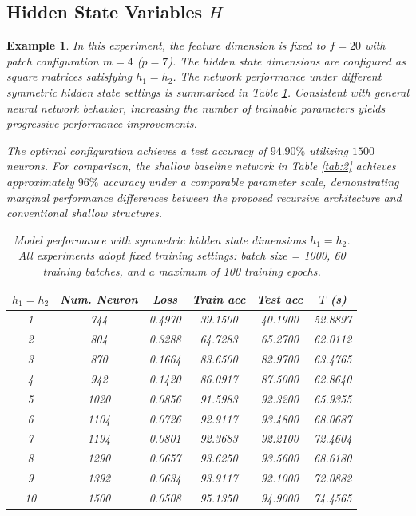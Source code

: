 \documentclass[pdflatex,sn-mathphys-num]{sn-jnl}%
\theoremstyle{thmstyleone}%
\theoremstyle{thmstyletwo}%
\newtheorem{example}{Example}%
\theoremstyle{thmstylethree}%
\begin{document}
\subsection{Hidden State Variables $H$}
\begin{example}
In this experiment, the feature dimension is fixed to $f=20$ with patch configuration $m=4$ ($p=7$). The hidden state dimensions are configured as square matrices satisfying $h_1=h_2$. The network performance under different symmetric hidden state settings is summarized in Table \ref{Tab:6}. Consistent with general neural network behavior, increasing the number of trainable parameters yields progressive performance improvements. 

The optimal configuration achieves a test accuracy of $94.90\%$ utilizing $1500$ neurons. For comparison, the shallow baseline network in Table \ref{tab:2} achieves approximately $96\%$ accuracy under a comparable parameter scale, demonstrating marginal performance differences between the proposed recursive architecture and conventional shallow structures.

\begin{table}[htbp]
\centering
\caption{Model performance with symmetric hidden state dimensions $h_1=h_2$. All experiments adopt fixed training settings: batch size = 1000, 60 training batches, and a maximum of 100 training epochs.}
\label{Tab:6}
\begin{tabular}{cccccc}
\toprule
$h_1=h_2$ &  Num. Neuron & Loss    & Train acc & Test acc & $T$ (s) \\
\midrule
1  & 744  & 0.4970 & 39.1500 & 40.1900 & 52.8897 \\
2  & 804  & 0.3288 & 64.7283 & 65.2700 & 62.0112 \\ 
3  & 870  & 0.1664 & 83.6500 & 82.9700 & 63.4765 \\
4  & 942  & 0.1420 & 86.0917 & 87.5000 & 62.8640 \\
5  & 1020 & 0.0856 & 91.5983 & 92.3200 & 65.9355 \\ 
6  & 1104 & 0.0726 & 92.9117 & 93.4800 & 68.0687 \\
7  & 1194 & 0.0801 & 92.3683 & 92.2100 & 72.4604 \\
8  & 1290 & 0.0657 & 93.6250 & 93.5600 & 68.6180 \\
9  & 1392 & 0.0634 & 93.9117 & 92.1000 & 72.0882 \\
10 & 1500 & 0.0508 & 95.1350 & 94.9000 & 74.4565 \\
\bottomrule
\end{tabular}
\end{table}
\end{example}
\end{document}
